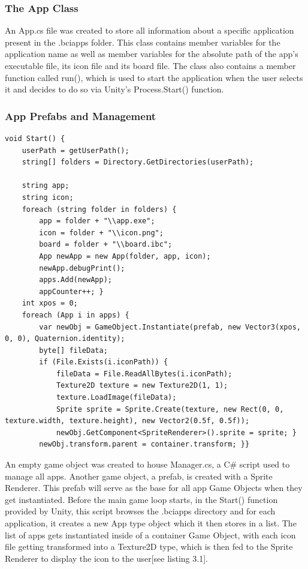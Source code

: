 \subsubsection{The App Class}
An App.cs file was created to store all information about a specific application present in the .bciapps folder. This class contains member variables for the application name as well as member variables for the absolute path of the app's executable file, its icon file and its board file. The class also contains a member function called run(), which is used to start the application when the user selects it and decides to do so via Unity's Process.Start() function.
\subsubsection{App Prefabs and Management}
\begin{lstlisting}[language={[Sharp]C}, caption={Manager.cs initialization}, label={lst:Manager Init}]
void Start() {
    userPath = getUserPath();
    string[] folders = Directory.GetDirectories(userPath);

    string app;
    string icon;
    foreach (string folder in folders) {
        app = folder + "\\app.exe";
        icon = folder + "\\icon.png";
        board = folder + "\\board.ibc";
        App newApp = new App(folder, app, icon);
        newApp.debugPrint();
        apps.Add(newApp);
        appCounter++; }
    int xpos = 0;
    foreach (App i in apps) {
        var newObj = GameObject.Instantiate(prefab, new Vector3(xpos, 0, 0), Quaternion.identity);
        byte[] fileData;
        if (File.Exists(i.iconPath)) {
            fileData = File.ReadAllBytes(i.iconPath);
            Texture2D texture = new Texture2D(1, 1);
            texture.LoadImage(fileData);
            Sprite sprite = Sprite.Create(texture, new Rect(0, 0, texture.width, texture.height), new Vector2(0.5f, 0.5f));
            newObj.GetComponent<SpriteRenderer>().sprite = sprite; }
        newObj.transform.parent = container.transform; }}
\end{lstlisting}


\noindent An empty game object was created to house Manager.cs, a C\# script used to manage all apps. Another game object, a prefab, is created with a Sprite Renderer. This prefab will serve as the base for all app Game Objects when they get instantiated. 
\vspace{\baselineskip}\newline
Before the main game loop starts, in the Start() function provided by Unity, this script browses the .bciapps directory and for each application, it creates a new App type object which it then stores in a list. The list of apps gets instantiated inside of a container Game Object, with each icon file getting transformed into a Texture2D type, which is then fed to the Sprite Renderer to display the icon to the user[see listing 3.1].

